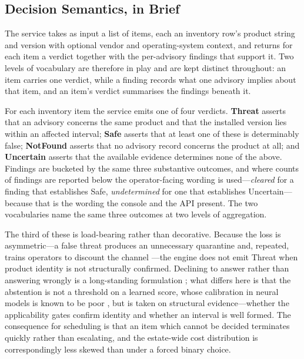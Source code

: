 \documentclass[fleqn,10pt,lineno]{wlpeerj}
\begin{document}
\subsection{Decision Semantics, in Brief}
The service takes as input a list of items, each an inventory row's product string and version with optional vendor and operating-system context, and returns for each item a verdict together with the per-advisory findings that support it. Two levels of vocabulary are therefore in play and are kept distinct throughout: an item carries one verdict, while a finding records what one advisory implies about that item, and an item's verdict summarises the findings beneath it.

For each inventory item the service emits one of four verdicts. \textbf{Threat} asserts that an advisory concerns the same product and that the installed version lies within an affected interval; \textbf{Safe} asserts that at least one of these is determinably false; \textbf{NotFound} asserts that no advisory record concerns the product at all; and \textbf{Uncertain} asserts that the available evidence determines none of the above. Findings are bucketed by the same three substantive outcomes, and where counts of findings are reported below the operator-facing wording is used---\emph{cleared} for a finding that establishes Safe, \emph{undetermined} for one that establishes Uncertain---because that is the wording the console and the API present. The two vocabularies name the same three outcomes at two levels of aggregation.

The third of these is load-bearing rather than decorative. Because the loss is asymmetric---a false threat produces an unnecessary quarantine and, repeated, trains operators to discount the channel \cite{tariq2025,jalalvand2025}---the engine does not emit Threat when product identity is not structurally confirmed. Declining to answer rather than answering wrongly is a long-standing formulation \cite{chow1970,elyaniv2010}; what differs here is that the abstention is not a threshold on a learned score, whose calibration in neural models is known to be poor \cite{guo2017}, but is taken on structural evidence---whether the applicability gates confirm identity and whether an interval is well formed. The consequence for scheduling is that an item which cannot be decided terminates quickly rather than escalating, and the estate-wide cost distribution is correspondingly less skewed than under a forced binary choice.
\end{document}
